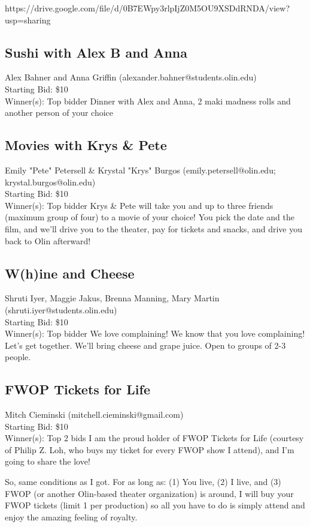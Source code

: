 \documentclass[11pt]{article}
\begin{document}
https://drive.google.com/file/d/0B7EWpy3rlpIjZ0M5OU9XSDdRNDA/view?usp=sharing
\subsection{Sushi with Alex B and Anna}
Alex Bahner and Anna Griffin (alexander.bahner@students.olin.edu) \\
Starting Bid: \$10 \\
Winner(s): 
Top bidder\newline
Dinner with Alex and Anna, 2 maki madness rolls and another person of your choice
\subsection{Movies with Krys \& Pete}
Emily "Pete" Petersell \& Krystal "Krys" Burgos (emily.petersell@olin.edu; krystal.burgos@olin.edu) \\
Starting Bid: \$10 \\
Winner(s): 
Top bidder\newline
Krys \& Pete will take you and up to three friends (maximum group of four) to a movie of your choice! You pick the date and the film, and we'll drive you to the theater, pay for tickets and snacks, and drive you back to Olin afterward!
\subsection{W(h)ine and Cheese}
Shruti Iyer, Maggie Jakus, Brenna Manning, Mary Martin (shruti.iyer@students.olin.edu) \\
Starting Bid: \$10 \\
Winner(s): 
Top bidder\newline
We love complaining! We know that you love complaining! Let's get together. We'll bring cheese and grape juice. Open to groups of 2-3 people.
\subsection{FWOP Tickets for Life}
Mitch Cieminski (mitchell.cieminski@gmail.com) \\
Starting Bid: \$10 \\
Winner(s): 
Top 2 bids\newline
I am the proud holder of FWOP Tickets for Life (courtesy of Philip Z. Loh, who buys my ticket for every FWOP show I attend), and I'm going to share the love!

So, same conditions as I got. For as long as: (1) You live, (2) I live, and (3) FWOP (or another Olin-based theater organization) is around, I will buy your FWOP tickets (limit 1 per production) so all you have to do is simply attend and enjoy the amazing feeling of royalty. 
\end{document}
